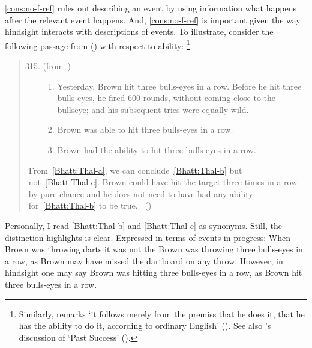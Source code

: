 \begin{note}
  \noindent%
  \autoref{cons:no-f-ref} rules out describing an event by using information what happens after the relevant event happens.
  And, \autoref{cons:no-f-ref} is important given the way hindsight interacts with descriptions of events.
  To illustrate, consider the following passage from \citeauthor{Bhatt:2008aa} (\citeyear{Bhatt:2008aa}) with respect to ability:%
  \footnote{
    Similarly, \citeauthor{Austin:1961vz} remarks `it follows merely from the premiss that he does it, that he has the ability to do it, according to ordinary English' (\citeyear[175]{Austin:1961vz}).
    See also \citeauthor{Boylan:2020aa}'s discussion of `Past Success' (\citeyear[\S1.1]{Boylan:2020aa}).
  }
  \begin{quote}
    \begin{enumerate}[label=(\arabic*)]
      \setcounter{enumi}{314}
    \item
      (from~\cite{Thalberg:1969ta})
      \begin{enumerate}[label=\alph*., ref=(315\alph*)]
      \item
        \label{Bhatt:Thal-a}
        Yesterday, Brown hit three bulls-eyes in a row.
        Before he hit three bulls-eyes, he fired 600 rounds, without coming close to the bullseye; and his subsequent tries were equally wild.
      \item
        \label{Bhatt:Thal-b}
        Brown was able to hit three bulls-eyes in a row.
      \item
        \label{Bhatt:Thal-c}
        Brown had the ability to hit three bulls-eyes in a row.
      \end{enumerate}
    \end{enumerate}
    From~\ref{Bhatt:Thal-a}, we can conclude~\ref{Bhatt:Thal-b} but not~\ref{Bhatt:Thal-c}.
    Brown could have hit the target three times in a row by pure chance and he does not need to have had any ability for~\ref{Bhatt:Thal-b} to be true.\newline
    \mbox{ }\hfill\mbox{(\citeyear[167]{Bhatt:2008aa})}
  \end{quote}
  Personally, I read \ref{Bhatt:Thal-b} and \ref{Bhatt:Thal-c} as synonyms.
  Still, the distinction \citeauthor{Bhatt:2008aa} highlights is clear.
  Expressed in terms of events in progress:
  When Brown was throwing darts it was not the Brown was throwing three bulls-eyes in a row, as Brown may have missed the dartboard on any throw.
  However, in hindsight one may say Brown was hitting three bulls-eyes in a row, as Brown hit three bulls-eyes in a row.


\end{note}
